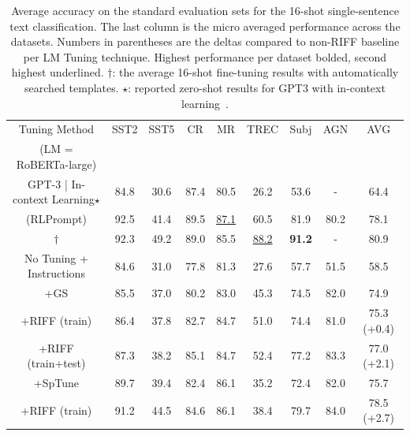 \documentclass[11pt]{article}
\begin{document}
\begin{table}
\centering
\caption{Average accuracy on the standard evaluation sets for the 16-shot single-sentence text classification. The last column is the micro averaged performance across the datasets. Numbers in parentheses are the deltas compared to non-RIFF baseline per LM Tuning technique. Highest performance per dataset bolded, second highest underlined. $\dagger$: the average 16-shot fine-tuning results with automatically searched templates. $\star$: reported zero-shot results for GPT3 with in-context learning~\cite{gao-etal-2021-making}.}

\begin{tabular}{c | c | c | c | c | c | c | c || c }
\hline
Tuning Method & SST2 & SST5 & CR & MR & TREC & Subj & AGN & AVG \\
\small(LM = RoBERTa-large) &  &  &  &  &  &  &  & \\
\hline
\small GPT-3 | In-context Learning$\star$ & \small84.8 & \small30.6 & \small87.4 & \small80.5 & \small26.2 & \small 53.6 & \small - & \small64.4 \\
\small \cite{deng-etal-2022-rlprompt} (RLPrompt) & \small92.5 & \small41.4 & \small89.5 & \small\underline{87.1} & \small60.5 & \small81.9 & \small 80.2 & \small78.1 \\
\small \cite{gao-etal-2021-making}$\dagger$ & \small92.3 & \small49.2 & \small89.0 & \small85.5 & \small\underline{88.2} & \small\textbf{91.2} & \small - & \small80.9 \\
\hline
\small No Tuning + Instructions & \small84.6 & \small31.0 & \small77.8 & \small81.3 & \small27.6 & \small 57.7 & \small 51.5 & \small58.5 \\
\hline
\small +GS & \small85.5 & \small37.0 & \small80.2 & \small83.0 & \small45.3 & \small74.5 & \small 82.0 & \small74.9 \\
\tiny+RIFF (train) & \small86.4 & \small37.8 & \small82.7 & \small84.7 & \small51.0 & \small74.4 & \small 81.0 &\;\;\;\;\;\;\;\;\small75.3 (+0.4) \\
\tiny+RIFF (train+test) & \small87.3 & \small38.2 & \small85.1 & \small84.7 & \small52.4 & \small77.2 & \small 83.3 &\;\;\;\;\;\;\;\;\small77.0 (+2.1) \\
\hline
\small +SpTune & \small89.7 & \small39.4 & \small82.4 & \small86.1 & \small35.2 & \small72.4 & \small 82.0 & \small75.7 \\
\tiny+RIFF (train) & \small91.2 & \small44.5 & \small84.6 & \small86.1 & \small38.4 & \small79.7 & \small 84.0 &\;\;\;\;\;\;\;\;\small78.5 (+2.7) \\

\end{tabular}
\end{table}
\end{document}
